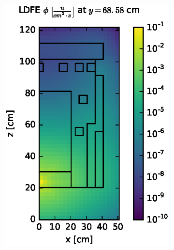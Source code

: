 \documentclass{article} %
\begin{document}
\begin{figure}[!htb]
\begin{subfigure}{0.4\textwidth}
\includegraphics[max height=0.445\textheight]
{dlvn-fwd-flux-ldfe01.eps}
\end{subfigure} ~
\begin{subfigure}{0.4\textwidth}

\end{subfigure}
\end{figure}
\end{document}
